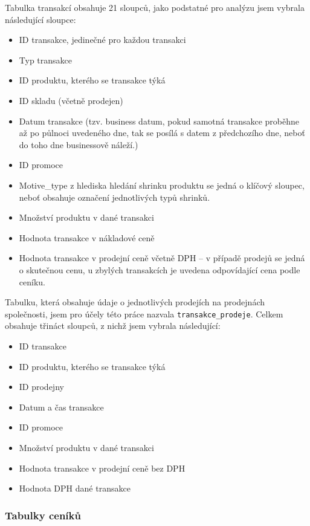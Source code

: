 Tabulka transakcí obsahuje 21 sloupců, jako podstatné pro analýzu jsem vybrala následující sloupce:

\begin{itemize}
    \item ID transakce, jedinečné pro každou transakci
    \item Typ transakce
    \item ID produktu, kterého se transakce týká
    \item ID skladu (včetně prodejen)
    \item Datum transakce (tzv. business datum, pokud samotná transakce proběhne až po půlnoci uvedeného dne, tak se posílá s datem z předchozího dne, neboť do toho dne businessově náleží.)
    \item ID promoce 
    \item Motive\_type z hlediska hledání shrinku produktu se jedná o klíčový sloupec, neboť obsahuje označení jednotlivých typů shrinků.
    \item Množství produktu v dané transakci
    \item Hodnota transakce v nákladové ceně
    \item Hodnota transakce v prodejní ceně včetně DPH -- v případě prodejů se jedná o skutečnou cenu, u zbylých transakcích je uvedena odpovídající cena podle ceníku.
\end{itemize}

Tabulku, která obsahuje údaje o jednotlivých prodejích na prodejnách společnosti, jsem pro účely této práce nazvala \texttt{transakce\_prodeje}. Celkem obsahuje třináct sloupců, z nichž jsem vybrala následující:

\begin{itemize}
    \item ID transakce
    \item ID produktu, kterého se transakce týká
    \item ID prodejny
    \item Datum a čas transakce 
    \item ID promoce
    \item Množství produktu v dané transakci
    \item Hodnota transakce v prodejní ceně bez DPH
    \item Hodnota DPH dané transakce
\end{itemize}

\subsubsection{Tabulky ceníků}





